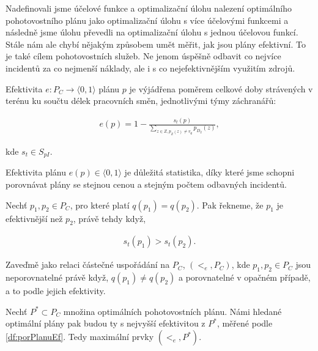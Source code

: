 Nadefinovali jsme účelové funkce a optimalizační úlohu nalezení optimálního pohotovostního plánu jako optimalizační úlohu s více účelovými funkcemi
a následně jsme úlohu převedli na optimalizační úlohu s jednou účelovou funkcí.
Stále nám ale chybí nějakým způsobem umět měřit, jak jsou plány efektivní.
To je také cílem pohotovostních služeb. Ne jenom úspěšně odbavit co nejvíce incidentů za co nejmenší náklady, ale i s co nejefektivnějším využitím zdrojů.

\begin{definice}\label{df:efPlanu}
  Efektivita $e \colon P_C \rightarrow \langle 0, 1 \rangle$ plánu $p$ je výjádřena poměrem celkové doby strávených v terénu ku součtu délek pracovních směn, jednotlivými týmy záchranářů:

  \begin{align*}
    e(p) = 1 - \frac{s_t(p)}{\sum_{z \in Z, p_Z(z) \neq v_{\emptyset}} p_{D_2}(z)},
  \end{align*}

  kde $s_t \in S_{pI}$.
\end{definice}

Efektivita plánu $e(p) \in \langle 0, 1 \rangle$ je důležitá statistika, díky které jsme schopni porovnávat plány se stejnou cenou a stejným počtem odbavných incidentů.

\begin{definice}\label{df:porPlanuEf}
  Nechť $p_1, p_2 \in P_C$, pro které platí $q(p_1) = q(p_2)$.
  Pak řekneme, že $p_1$ je efektivnější než $p_2$, právě tehdy když,

  \begin{align*}
    s_t(p_1) > s_t(p_2).
  \end{align*}

  Zaveďmě jako relaci částečné uspořádání na $P_C$, $(<_e, P_C)$, kde $p_1, p_2 \in P_C$ jsou neporovnatelné právě když, $q(p_1) \neq q(p_2)$ a
  porovnatelné v opačném případě, a to podle jejich efektivity.
\end{definice}

\begin{definice}
  Nechť $P^* \subset P_C$ množina optimálních pohotovostních plánu. Námi hledané optimální plány pak budou ty s nejvyšší efektivitou z $P^*$, měřené podle \ref{df:porPlanuEf}.
  Tedy maximální prvky $(<_e, P^*)$.
\end{definice}

